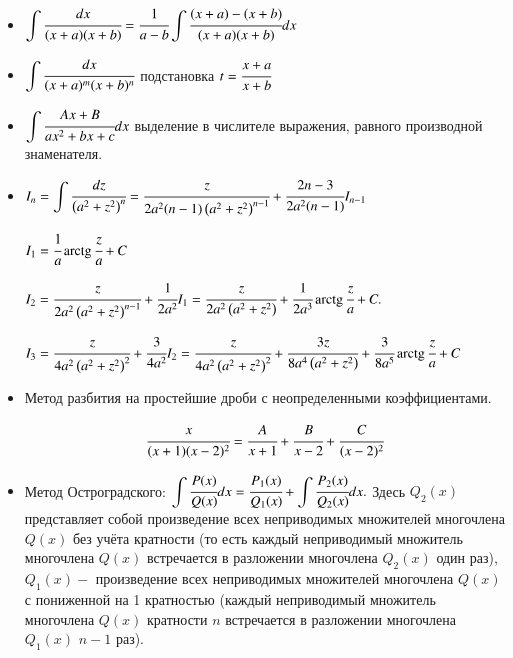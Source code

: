 \documentclass[twoside, a4paperpt]{extarticle}
\begin{document}
\begin{itemize}
    \item $ \displaystyle \int \cfrac{d x}{(x+a)(x+b)}=\cfrac{1}{a-b} \displaystyle \int \cfrac{(x+a)-(x+b)}{(x+a)(x+b)} d x $
    \item $ \displaystyle \int \cfrac{d x}{(x+a)^{m}(x+b)^{n}}$ подстановка $ t=\cfrac{x+a}{x+b} $
    \item $ \displaystyle \int \cfrac{A x+B}{a x^{2}+b x+c} d x$ выделение в числителе выражения,  равного производной знаменателя.
    \item $I_{n}=\displaystyle \int \cfrac{d z}{\left(a^{2}+z^{2}\right)^{n}} = \cfrac{z}{2 a^{2}(n-1)\left(a^{2}+z^{2}\right)^{n-1}}+\cfrac{2 n-3}{2 a^{2}(n-1)} I_{n-1}$
    
    $I_{1}=\cfrac{1}{a} \operatorname{arctg} \cfrac{z}{a}+C$
    
    $I_{2}=\cfrac{z}{2 a^{2}\left(a^{2}+z^{2}\right)^{n-1}}+\cfrac{1}{2 a^{2}} I_{1}=\cfrac{z}{2 a^{2}\left(a^{2}+z^{2}\right)}+\cfrac{1}{2 a^{3}} \operatorname{arctg} \cfrac{z}{a}+C .$
    
    $I_{3}=\cfrac{z}{4 a^{2}\left(a^{2}+z^{2}\right)^{2}}+\cfrac{3}{4 a^{2}} I_{2}=\cfrac{z}{4 a^{2}\left(a^{2}+z^{2}\right)^{2}}+\cfrac{3 z}{8 a^{4}\left(a^{2}+z^{2}\right)}+\cfrac{3}{8 a^{5}} \operatorname{arctg} \cfrac{z}{a}+C$

    \item Метод разбития на простейшие дроби с неопределенными коэффициентами.

    $$\cfrac{x}{(x+1)(x-2)^{2}}=\cfrac{A}{x+1}+\cfrac{B}{x-2}+\cfrac{C}{(x-2)^{2}}$$
    \newpage
    \item Метод Остроградского: $\displaystyle \int \cfrac{P(x)}{Q(x)} d x=\cfrac{P_{1}(x)}{Q_{1}(x)}+\displaystyle \int \cfrac{P_{2}(x)}{Q_{2}(x)} d x .$
    Здесь $Q_{2}(x)$ представляет собой произведение всех неприводимых множителей многочлена $Q(x)$ без учёта кратности (то есть каждый неприводимый множитель многочлена $Q(x)$ встречается в разложении многочлена $Q_{2}(x)$ один раз), $Q_{1}(x)-$ произведение всех неприводимых множителей многочлена $Q(x)$ с пониженной на 1 кратностью (каждый неприводимый множитель многочлена $Q(x)$ кратности $n$ встречается в разложении многочлена $Q_{1}(x)$ $n-1$ раз).
\end{itemize}
\end{document}
